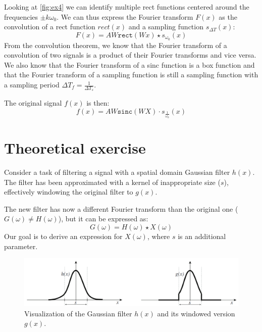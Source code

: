 \documentclass[tikz,14pt,fleqn]{article}
\begin{document}

Looking at \autoref{fig:ex4} we can identify multiple rect functions centered around the frequencies $±k\omega_0$. We can thus express the Fourier transform $F(x)$ as the convolution of a rect function $rect(x)$ and a sampling function $s_{\Delta T}(x)$:
\begin{equation*}
    F(x) = AW\texttt{rect}(Wx) \star s_{\omega_0}(x)
\end{equation*}
From the convolution theorem, we know that the Fourier transform of a convolution of two signals is a product of their Fourier transforms and vice versa.
We also know that the Fourier transform of a sinc function is a box function and that the Fourier transform of a sampling function is still a sampling function with a sampling period $\Delta T_f = \frac{1}{\Delta T_s}$.

The original signal $f(x)$ is then:
\begin{equation*}
    f(x) = AW\texttt{sinc}(WX) \cdot s_{\frac1{\omega_0}}(x)
\end{equation*}




\section{Theoretical exercise}
Consider a task of filtering a signal with a spatial domain Gaussian filter $h(x)$. 
The filter has been approximated with a kernel of inappropriate size ($s$), effectively windowing the original filter to $g(x)$.

The new filter has now a different Fourier transform than the original one ($G(\omega) \neq H(\omega)$), but it can be expressed as:
\begin{equation*}
    G(\omega) = H(\omega) \star X(\omega)
\end{equation*}
Our goal is to derive an expression for $X(\omega)$, where $s$ is an additional parameter.

\begin{figure}[H]
    \centering
    \includegraphics[width=0.8\linewidth]{fig/5.hx-gx.png}
    \caption{Visualization of the Gaussian filter $h(x)$ and its windowed version $g(x)$.}
    \label{fig:ex5}
\end{figure}
\end{document}
